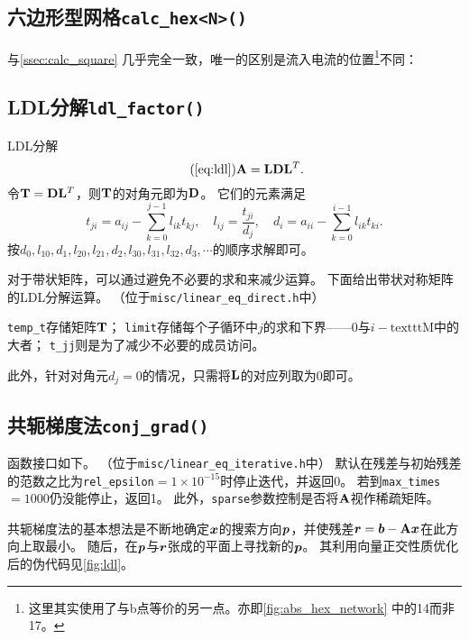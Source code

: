 \subsection{六边形型网格\texttt{calc\_hex<N>()}}
与\autoref{ssec:calc_square} 几乎完全一致，唯一的区别是流入电流的位置\footnote{这里其实使用了与b点等价的另一点。亦即\autoref{fig:abs_hex_network} 中的14而非17。}不同：
{
    \linespread{1.0}
    
}

\subsection{LDL分解\texttt{ldl\_factor()}}
\label{ssec:ldl}
LDL分解
\begin{equation}\tag{\ref{eq:ldl}}
    \vb{A} = \vb{L}\vb{D}\vb{L}^T.
\end{equation}
令$\vb{T} = \vb{D}\vb{L}^T$，则$\vb{T}$的对角元即为$\vb{D}$。
它们的元素满足
\begin{equation}
    t_{ji} = a_{ij} - \sum_{k=0}^{j-1} l_{ik}t_{kj},\quad
    l_{ij} = \frac{t_{ji}}{d_{j}},\quad
    d_{i} = a_{ii} - \sum_{k=0}^{i-1} l_{ik}t_{ki}.
\end{equation}
按$d_0,l_{10},d_1,l_{20},l_{21},d_2,l_{30},l_{31},l_{32},d_3,\cdots$的顺序求解即可。

对于带状矩阵，可以通过避免不必要的求和来减少运算。
下面给出带状对称矩阵的LDL分解运算。
（位于\texttt{misc/linear\_eq\_direct.h}中）
{
    \linespread{1.0}
    
}
\verb|temp_t|存储矩阵$\vb{T}$；
\verb|limit|存储每个子循环中$j$的求和下界——0与$i-\text{texttt{M}}$中的大者；
\verb|t_jj|则是为了减少不必要的成员访问。

此外，针对对角元$d_j=0$的情况，只需将$\vb{L}$的对应列取为0即可。

\subsection{共轭梯度法\texttt{conj\_grad()}}
\label{ssec:conj_grad}
函数接口如下。
（位于\texttt{misc/linear\_eq\_iterative.h}中）
默认在残差与初始残差的范数之比为\texttt{rel\_epsilon}$=1\times 10^{-15}$时停止迭代，并返回0。
若到\texttt{max\_times}$=1000$仍没能停止，返回1。
此外，\texttt{sparse}参数控制是否将$\vb{A}$视作稀疏矩阵。
{
    \linespread{1.0}
    
}
共轭梯度法的基本想法是不断地确定$\vb*{x}$的搜索方向$\vb*{p}$，并使残差$\vb*{r}=\vb*{b}-\vb{A}\vb*{x}$在此方向上取最小。
随后，在$\vb*{p}$与$\vb*{r}$张成的平面上寻找新的$\vb*{p}$。
其利用向量正交性质优化后的伪代码见\autoref{fig:ldl}。

